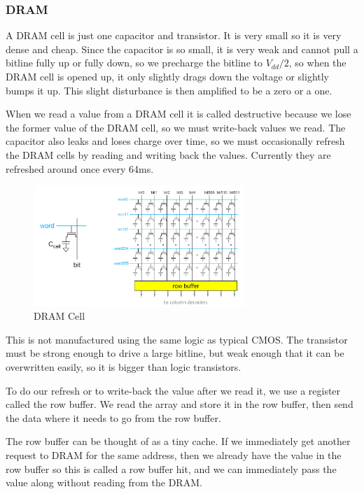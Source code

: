 \documentclass{article}
\begin{document}
\subsubsection{DRAM}

A DRAM cell is just one capacitor and transistor. It is very small so it is very dense and cheap. Since the capacitor is so small, it is very weak and cannot pull a bitline fully up or fully down, so we precharge the bitline to $V_{dd}/2$, so when the DRAM cell is opened up, it only slightly drags down the voltage or slightly bumps it up. This slight disturbance is then amplified to be a zero or a one.



When we read a value from a DRAM cell it is called destructive because we lose the former value of the DRAM cell, so we must write-back values we read. The capacitor also leaks and loses charge over time, so we must occasionally refresh the DRAM cells by reading and writing back the values. Currently they are refreshed around once every 64ms. 


\begin{figure}[ht!]
\centering
\includegraphics[width=80mm]{img/DRAM.png}
\caption{DRAM Cell}
\end{figure}

This is not manufactured using the same logic as typical CMOS. The transistor must be strong enough to drive a large bitline, but weak enough that it can be overwritten easily, so it is bigger than logic transistors.

To do our refresh or to write-back the value after we read it, we use a register called the row buffer. We read the array and store it in the row buffer, then send the data where it needs to go from the row buffer. 

The row buffer can be thought of as a tiny cache. If we immediately get another request to DRAM for the same address, then we already have the value in the row buffer so this is called a row buffer hit, and we can immediately pass the value along without reading from the DRAM. 
\end{document}
